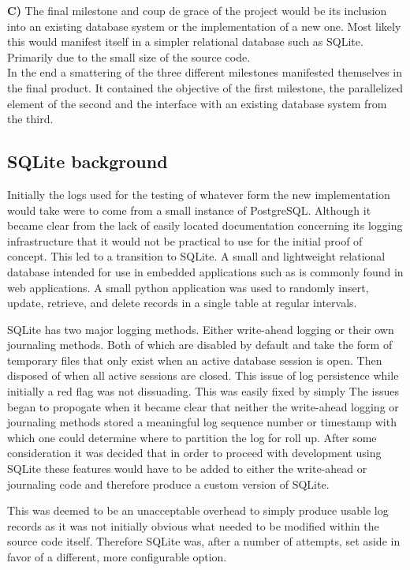 \documentclass{article}
\begin{document}
\textbf{C)} The final milestone and coup de grace of the project would be its inclusion into an existing
database system or the implementation of a new one. Most likely this would manifest itself in a simpler
relational database such as SQLite. Primarily due to the small size of the source code.\\

In the end a smattering of the three different milestones manifested themselves in the final product. It contained the objective of the first milestone, the parallelized element of the second and the interface with an existing database system from the third.\\

\subsection{SQLite background}
Initially the logs used for the testing of whatever form the new implementation would take were to come from a small instance of PostgreSQL. Although it became clear from the lack of easily located documentation concerning its logging infrastructure that it would not be practical to use for the initial proof of concept. This led to a transition to SQLite. A small and lightweight relational database intended for use in embedded applications such as is commonly found in web applications. A small python application was used to randomly insert, update, retrieve, and delete records in a single table at regular intervals.
 
SQLite has two major logging methods. Either write-ahead logging or their own journaling methods. Both of which are disabled by default and take the form of temporary files that only exist when an active database session is open. Then disposed of when all active sessions are closed. This issue of log persistence while initially a red flag was not dissuading. This was easily fixed by simply The issues began to propogate when it became clear that neither the write-ahead logging or journaling methods stored a meaningful log sequence number or timestamp with which one could determine where to partition the log for roll up. After some consideration it was decided that in order to proceed with development using SQLite these features would have to be added to either the write-ahead or journaling code and therefore produce a custom version of SQLite.

This was deemed to be an unacceptable overhead to simply produce usable log records as it was not initially obvious what needed to be modified within the source code itself. Therefore SQLite was, after a number of attempts, set aside in favor of a different, more configurable option.
\end{document}
